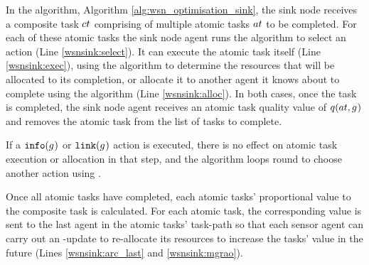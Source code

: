 In the \acronymWSNOptimisationSink{}{} algorithm, Algorithm \ref{alg:wsn_optimisation_sink}, the sink node receives a composite task $\varCompositeTask{}{}$ comprising of multiple atomic tasks $\varAtomicTask{}{}$ to be completed. For each of these atomic tasks the sink node agent runs the \acronymATARIA{}{} algorithm to select an action (Line \ref{wsnsink:select}). It can execute the atomic task itself (Line \ref{wsnsink:exec}), using the \acronymMGRAO{}{} algorithm to determine the resources that will be allocated to its completion, or allocate it to another agent it knows about to complete using the \acronymWSNOptimisationArc{}{} algorithm (Line \ref{wsnsink:alloc}). In both cases, once the task is completed, the sink node agent receives an atomic task quality value of $\functionAtomicTaskQualitySignature{}{}$ and removes the atomic task from the list of tasks to complete. 

If a $\texttt{info}(g_{}^{})$ or $\texttt{link}(g_{}^{})$ action is executed, there is no effect on atomic task execution or allocation in that step, and the algorithm loops round to choose another action using \acronymATARIA{}{}.

Once all atomic tasks have completed, each atomic tasks' proportional value to the composite task is calculated. For each atomic task, the corresponding value is sent to the last agent in the atomic tasks' task-path so that each sensor agent can carry out an \acronymMGRAO{}{}-update to re-allocate its resources to increase the tasks' value in the future (Lines \ref{wsnsink:arc_last} and \ref{wsnsink:mgrao}). 

